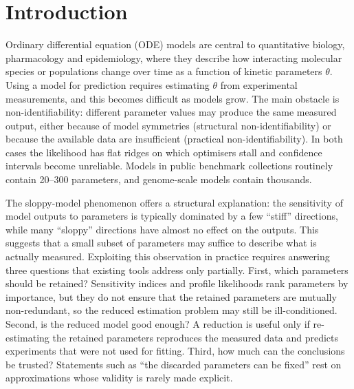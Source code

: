\documentclass[pdflatex,sn-nature]{sn-jnl}
\theoremstyle{plain}
\begin{document}

\maketitle

\raggedright
\setlength{\parindent}{1.5em}

\section*{Introduction}\label{sec:intro}

Ordinary differential equation (ODE) models are central to quantitative biology, pharmacology and epidemiology, where they describe how interacting molecular species or populations change over time as a function of kinetic parameters $\theta$\cite{bib16}. Using a model for prediction requires estimating $\theta$ from experimental measurements, and this becomes difficult as models grow. The main obstacle is non-identifiability: different parameter values may produce the same measured output, either because of model symmetries (structural non-identifiability) or because the available data are insufficient (practical non-identifiability)\cite{bib4,bib10,bib29}. In both cases the likelihood has flat ridges on which optimisers stall and confidence intervals become unreliable\cite{bib24,bib25,bib17}. Models in public benchmark collections routinely contain 20--300 parameters\cite{bib31}, and genome-scale models contain thousands\cite{bib12}.

The sloppy-model phenomenon offers a structural explanation\cite{bib15}: the sensitivity of model outputs to parameters is typically dominated by a few ``stiff'' directions, while many ``sloppy'' directions have almost no effect on the outputs. This suggests that a small subset of parameters may suffice to describe what is actually measured. Exploiting this observation in practice requires answering three questions that existing tools address only partially. First, which parameters should be retained? Sensitivity indices\cite{bib26,bib23} and profile likelihoods\cite{bib24} rank parameters by importance, but they do not ensure that the retained parameters are mutually non-redundant, so the reduced estimation problem may still be ill-conditioned\cite{bib5,bib9}. Second, is the reduced model good enough? A reduction is useful only if re-estimating the retained parameters reproduces the measured data and predicts experiments that were not used for fitting. Third, how much can the conclusions be trusted? Statements such as ``the discarded parameters can be fixed'' rest on approximations whose validity is rarely made explicit.
\end{document}
